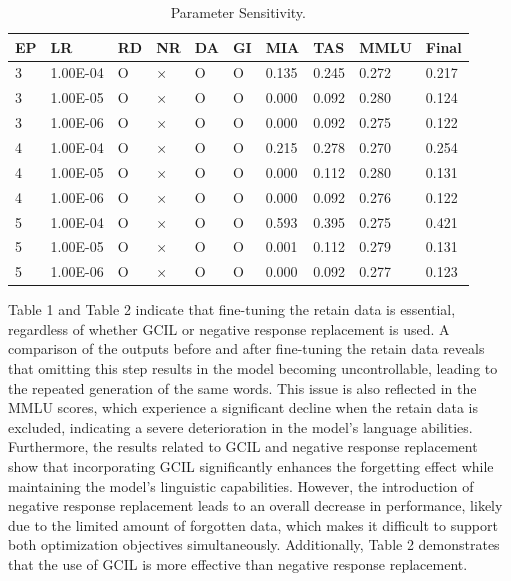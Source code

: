 \documentclass[11pt]{article}
\begin{document}
\begin{table}[t]
  \centering
    \begin{tabular}{|l|l|l|l|l|l|l|l|l|l|}
    \hline
        EP & LR & RD & NR & DA & GI & MIA & TAS & MMLU & Final \\ \hline
        3 & 1.00E-04 & O & × & O & O & 0.135 & 0.245 & 0.272 & 0.217 \\ \hline
        3 & 1.00E-05 & O & × & O & O & 0.000 & 0.092 & 0.280 & 0.124 \\ \hline
        3 & 1.00E-06 & O & × & O & O & 0.000 & 0.092 & 0.275 & 0.122 \\ \hline
        4 & 1.00E-04 & O & × & O & O & 0.215 & 0.278 & 0.270 & 0.254 \\ \hline
        4 & 1.00E-05 & O & × & O & O & 0.000 & 0.112 & 0.280 & 0.131 \\ \hline
        4 & 1.00E-06 & O & × & O & O & 0.000 & 0.092 & 0.276 & 0.122 \\ \hline
        5 & 1.00E-04 & O & × & O & O & 0.593 & 0.395 & 0.275 & 0.421 \\ \hline
        5 & 1.00E-05 & O & × & O & O & 0.001 & 0.112 & 0.279 & 0.131 \\ \hline
        5 & 1.00E-06 & O & × & O & O & 0.000 & 0.092 & 0.277 & 0.123 \\ \hline
    \end{tabular}
  \caption{
    Parameter Sensitivity.  }
\label{tab:AS1}
\end{table}


Table 1 and Table 2 indicate that fine-tuning the retain data is essential, regardless of whether GCIL or negative response replacement is used. A comparison of the outputs before and after fine-tuning the retain data reveals that omitting this step results in the model becoming uncontrollable, leading to the repeated generation of the same words. This issue is also reflected in the MMLU scores, which experience a significant decline when the retain data is excluded, indicating a severe deterioration in the model's language abilities. Furthermore, the results related to GCIL and negative response replacement show that incorporating GCIL significantly enhances the forgetting effect while maintaining the model's linguistic capabilities. However, the introduction of negative response replacement leads to an overall decrease in performance, likely due to the limited amount of forgotten data, which makes it difficult to support both optimization objectives simultaneously. Additionally, Table 2 demonstrates that the use of GCIL is more effective than negative response replacement.
\end{document}
